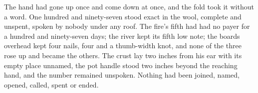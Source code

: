 The hand had gone up once and come down at once, and the fold took it without a word. One hundred and ninety-seven stood exact in the wool, complete and unspent, spoken by nobody under any roof. The fire's fifth had had no payer for a hundred and ninety-seven days; the river kept its fifth low note; the boards overhead kept four nails, four and a thumb-width knot, and none of the three rose up and became the others. The crust lay two inches from his ear with its empty place unnamed, the pot handle stood two inches beyond the reaching hand, and the number remained unspoken. Nothing had been joined, named, opened, called, spent or ended.
